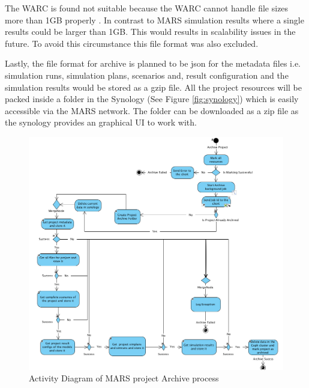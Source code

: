     The WARC is found not suitable because the WARC cannot handle file sizes more than 1GB properly \cite[Appendix B]{WARC}. 
    In contrast to MARS simulation results where a single results could be larger than 1GB. This would results in scalability issues in the future. To 
    avoid this circumstance this file format was also excluded.

    Lastly, the file format for archive is planned to be json for the metadata files i.e. simulation runs, simulation plans, scenarios and, result configuration and 
    the simulation results would be stored as a gzip file. All the project resources will be packed inside a folder in the Synology (See Figure \ref{fig:synology})
     which is easily accessible via the MARS network.
    The folder can be downloaded as a zip file as the synology provides an graphical UI to work with.   

\begin{figure}[H]
    \centering \includegraphics[scale=0.45]{grafiken/archiveActivity.png}
    \caption{Activity Diagram of MARS project Archive process}
    \label{fig:archiveActivity}
\end{figure}

